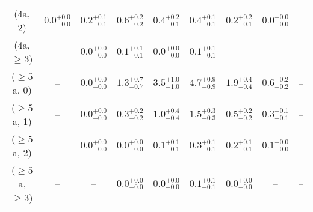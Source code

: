 \begin{table}[h!]
{\begin{tabular}{ccccccccc}
	(4a, 2) & $0.0^{+ 0.0 }_{- 0.0 }$ & $0.2^{+ 0.1 }_{- 0.1 }$ & $0.6^{+ 0.2 }_{- 0.2 }$ & $0.4^{+ 0.2 }_{- 0.1 }$ & $0.4^{+ 0.1 }_{- 0.1 }$ & $0.2^{+ 0.2 }_{- 0.1 }$ & $0.0^{+ 0.0 }_{- 0.0 }$ & -- \\[0.5ex] 
	(4a, $\ge3$) & -- & $0.0^{+ 0.0 }_{- 0.0 }$ & $0.1^{+ 0.1 }_{- 0.1 }$ & $0.0^{+ 0.0 }_{- 0.0 }$ & $0.1^{+ 0.1 }_{- 0.1 }$ & -- & -- & -- \\[0.5ex] 
	($\ge5$a, 0) & -- & $0.0^{+ 0.0 }_{- 0.0 }$ & $1.3^{+ 0.7 }_{- 0.7 }$ & $3.5^{+ 1.0 }_{- 1.0 }$ & $4.7^{+ 0.9 }_{- 0.9 }$ & $1.9^{+ 0.4 }_{- 0.4 }$ & $0.6^{+ 0.2 }_{- 0.2 }$ & -- \\[0.5ex] 
	($\ge5$a, 1) & -- & $0.0^{+ 0.0 }_{- 0.0 }$ & $0.3^{+ 0.2 }_{- 0.2 }$ & $1.0^{+ 0.4 }_{- 0.4 }$ & $1.5^{+ 0.3 }_{- 0.3 }$ & $0.5^{+ 0.2 }_{- 0.2 }$ & $0.3^{+ 0.1 }_{- 0.1 }$ & -- \\[0.5ex] 
	($\ge5$a, 2) & -- & $0.0^{+ 0.0 }_{- 0.0 }$ & $0.0^{+ 0.0 }_{- 0.0 }$ & $0.1^{+ 0.1 }_{- 0.1 }$ & $0.3^{+ 0.1 }_{- 0.1 }$ & $0.2^{+ 0.1 }_{- 0.1 }$ & $0.1^{+ 0.0 }_{- 0.0 }$ & -- \\[0.5ex] 
	($\ge5$a, $\ge3$) & -- & -- & $0.0^{+ 0.0 }_{- 0.0 }$ & $0.0^{+ 0.0 }_{- 0.0 }$ & $0.1^{+ 0.1 }_{- 0.1 }$ & $0.0^{+ 0.0 }_{- 0.0 }$ & -- & -- \\[0.5ex] 
	\hline
	\hline
\end{tabular}}
\end{table}
